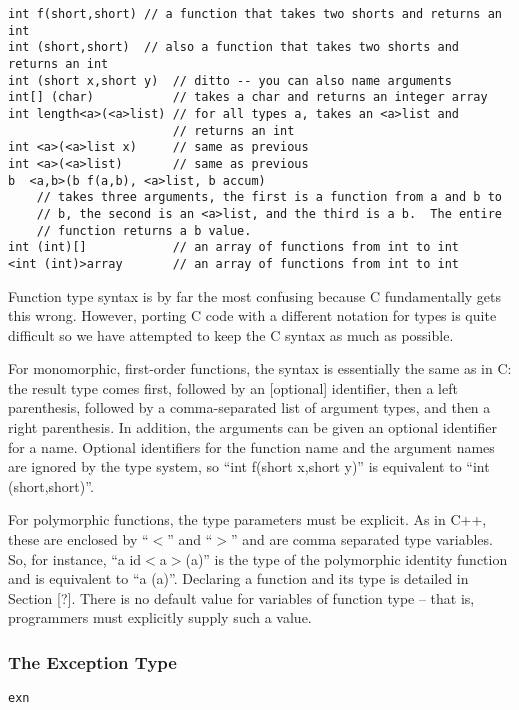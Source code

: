 \documentclass[titlepage,10pt]{article}
\begin{document}
\begin{verbatim}
int f(short,short) // a function that takes two shorts and returns an int
int (short,short)  // also a function that takes two shorts and returns an int
int (short x,short y)  // ditto -- you can also name arguments
int[] (char)           // takes a char and returns an integer array
int length<a>(<a>list) // for all types a, takes an <a>list and 
                       // returns an int
int <a>(<a>list x)     // same as previous
int <a>(<a>list)       // same as previous
b  <a,b>(b f(a,b), <a>list, b accum) 
    // takes three arguments, the first is a function from a and b to
    // b, the second is an <a>list, and the third is a b.  The entire
    // function returns a b value.
int (int)[]            // an array of functions from int to int
<int (int)>array       // an array of functions from int to int
\end{verbatim}

Function type syntax is by far the most confusing because C
fundamentally gets this wrong.  However, porting C code with a different
notation for types is quite difficult so we have attempted to keep the C
syntax as much as possible.

For monomorphic, first-order functions, the syntax is essentially the
same as in C:  the result type comes first, followed by an [optional]
identifier, then a left parenthesis, followed by a comma-separated list
of argument types, and then a right parenthesis.   In addition, the
arguments can be given an optional identifier for a name.  Optional
identifiers for the function name and the argument names are ignored by
the type system, so ``int f(short x,short y)'' is equivalent to ``int
(short,short)''.

For polymorphic functions, the type parameters must be explicit.   As in
C++, these are enclosed by ``$<$'' and ``$>$'' and are comma separated
type variables.   So, for instance, ``a id$<$a$>$(a)'' is the type of
the polymorphic identity function and is equivalent to ``a (a)''.
Declaring a function and its type is detailed in Section [?].  There is
no default value for variables of function type -- that is, programmers
must explicitly supply such a value.

\subsubsection{The Exception Type}


\begin{verbatim}
exn
\end{verbatim}
\end{document}
